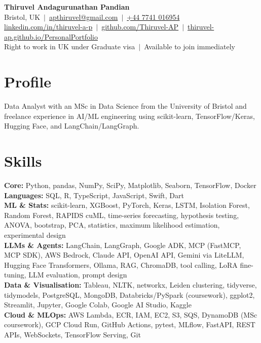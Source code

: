 \documentclass[a4paper,11pt]{article}
\begin{document}
\fontsize{11}{13.2}\selectfont

\begin{center}
  {\LARGE\bfseries Thiruvel Andagurunathan Pandian}\\[3pt]
  Bristol, UK \,$|$\, \href{mailto:apthiruvel@gmail.com}{apthiruvel@gmail.com} \,$|$\, \href{tel:+447741016954}{+44 7741 016954}\\[1pt]
\href{https://www.linkedin.com/in/thiruvel-a-p/}{linkedin.com/in/thiruvel-a-p} \,$|$\, \href{https://github.com/Thiruvel-AP}{github.com/Thiruvel-AP} \,$|$\, \href{https://thiruvel-ap.github.io/PersonalPortfolio/}{thiruvel-ap.github.io/PersonalPortfolio}\\[1pt]
  Right to work in UK under Graduate visa \,$|$\, Available to join immediately
\end{center}

\section{Profile}
Data Analyst with an MSc in Data Science from the University of Bristol and freelance experience in AI/ML engineering using scikit-learn, TensorFlow/Keras, Hugging Face, and LangChain/LangGraph.

\section{Skills}
\textbf{Core:} Python, pandas, NumPy, SciPy, Matplotlib, Seaborn, TensorFlow, Docker\\[2pt]
\textbf{Languages:} SQL, R, TypeScript, JavaScript, Swift, Dart\\[2pt]
\textbf{ML \& Stats:} scikit-learn, XGBoost, PyTorch, Keras, LSTM, Isolation Forest, Random Forest, RAPIDS cuML, time-series forecasting, hypothesis testing, ANOVA, bootstrap, PCA, statistics, maximum likelihood estimation, experimental design\\[2pt]
\textbf{LLMs \& Agents:} LangChain, LangGraph, Google ADK, MCP (FastMCP, MCP SDK), AWS Bedrock, Claude API, OpenAI API, Gemini via LiteLLM, Hugging Face Transformers, Ollama, RAG, ChromaDB, tool calling, LoRA fine-tuning, LLM evaluation, prompt design\\[2pt]
\textbf{Data \& Visualisation:} Tableau, NLTK, networkx, Leiden clustering, tidyverse, tidymodels, PostgreSQL, MongoDB, Databricks/PySpark (coursework), ggplot2, Streamlit, Jupyter, Google Colab, Google AI Studio, Kaggle\\[2pt]
\textbf{Cloud \& MLOps:} AWS Lambda, ECR, IAM, EC2, S3, SQS, DynamoDB (MSc coursework), GCP Cloud Run, GitHub Actions, pytest, MLflow, FastAPI, REST APIs, WebSockets, TensorFlow Serving, Git
\end{document}
